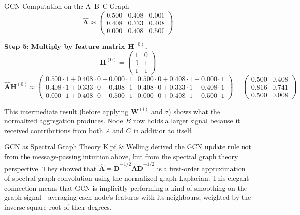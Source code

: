 \begin{examplebox}{GCN Computation on the A--B--C Graph}
\[
\hat{\mathbf{A}} \approx \begin{pmatrix} 0.500 & 0.408 & 0.000 \\ 0.408 & 0.333 & 0.408 \\ 0.000 & 0.408 & 0.500 \end{pmatrix}
\]

\textbf{Step 5: Multiply by feature matrix $\mathbf{H}^{(0)}$.}
\[
\mathbf{H}^{(0)} = \begin{pmatrix} 1 & 0 \\ 0 & 1 \\ 1 & 1 \end{pmatrix}
\]
\[
\hat{\mathbf{A}} \mathbf{H}^{(0)} \approx
\begin{pmatrix}
0.500 \cdot 1 + 0.408 \cdot 0 + 0.000 \cdot 1 & 0.500 \cdot 0 + 0.408 \cdot 1 + 0.000 \cdot 1 \\
0.408 \cdot 1 + 0.333 \cdot 0 + 0.408 \cdot 1 & 0.408 \cdot 0 + 0.333 \cdot 1 + 0.408 \cdot 1 \\
0.000 \cdot 1 + 0.408 \cdot 0 + 0.500 \cdot 1 & 0.000 \cdot 0 + 0.408 \cdot 1 + 0.500 \cdot 1
\end{pmatrix}
=
\begin{pmatrix} 0.500 & 0.408 \\ 0.816 & 0.741 \\ 0.500 & 0.908 \end{pmatrix}
\]

This intermediate result (before applying $\mathbf{W}^{(l)}$ and $\sigma$) shows what the normalized aggregation produces. Node $B$ now holds a larger signal because it received contributions from both $A$ and $C$ in addition to itself.
\end{examplebox}

\begin{keyinsight}{GCN as Spectral Graph Theory}
Kipf \& Welling derived the GCN update rule not from the message-passing intuition above, but from the spectral graph theory perspective. They showed that $\hat{\mathbf{A}} = \tilde{\mathbf{D}}^{-1/2} \tilde{\mathbf{A}} \tilde{\mathbf{D}}^{-1/2}$ is a first-order approximation of spectral graph convolution using the normalized graph Laplacian. This elegant connection means that GCN is implicitly performing a kind of smoothing on the graph signal---averaging each node's features with its neighbours, weighted by the inverse square root of their degrees.
\end{keyinsight}

